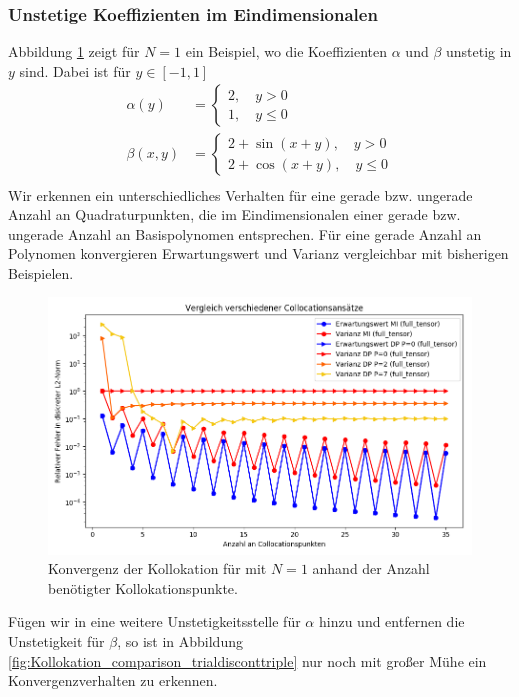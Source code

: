 \subsubsection*{Unstetige Koeffizienten im Eindimensionalen}
Abbildung \ref{fig:Kollokation_comparison_trialdiscontsimple} zeigt für $N=1$ ein Beispiel, wo die Koeffizienten $\alpha$ und $\beta$ unstetig in $y$ sind. Dabei ist für $y\in[-1,1]$
\begin{align*}
\alpha(y)&=\begin{cases}2,\quad y>0\\ 1, \quad y\le 0\end{cases}\\
\beta(x,y)&=\begin{cases}2+\sin(x+y),\quad y>0\\ 2+\cos(x+y),\quad y\le 0\end{cases}\\
\end{align*}
Wir erkennen ein unterschiedliches Verhalten für eine gerade bzw. ungerade Anzahl an Quadraturpunkten, die im Eindimensionalen einer gerade bzw. ungerade Anzahl an Basispolynomen entsprechen. Für eine gerade Anzahl an Polynomen konvergieren Erwartungswert und Varianz vergleichbar mit bisherigen Beispielen.
\begin{figure}[!htb]
\includegraphics[width=\textwidth]{Figures/collocation_midp_trialdiscontsimple.png}
\caption{Konvergenz der Kollokation für  mit $N=1$ anhand der Anzahl benötigter Kollokationspunkte.}
\label{fig:Kollokation_comparison_trialdiscontsimple}
\end{figure}
Fügen wir in  eine weitere Unstetigkeitsstelle für $\alpha$ hinzu und entfernen die Unstetigkeit für $\beta$, so ist in Abbildung \ref{fig:Kollokation_comparison_trialdisconttriple} nur noch mit großer Mühe ein Konvergenzverhalten zu erkennen.
